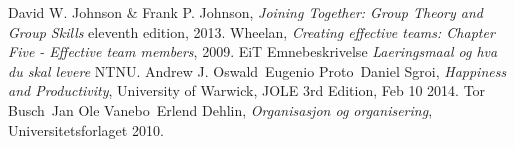 \begin{thebibliography}{99}	%
		David W. Johnson \& Frank P. Johnson,
		\emph{Joining Together: Group Theory and Group Skills}
		eleventh edition,
		2013.
		Wheelan,
		\emph{Creating effective teams: Chapter Five - Effective team members},
		2009.
		EiT Emnebeskrivelse
		\emph{Laeringsmaal og hva du skal levere}
		NTNU.
		Andrew J. Oswald\, Eugenio Proto\, Daniel Sgroi,
		\emph{Happiness and Productivity},
		University of Warwick,
		JOLE 3rd Edition, Feb 10 2014.
		Tor Busch\, Jan Ole Vanebo\, Erlend Dehlin,
		\emph{Organisasjon og organisering},
		Universitetsforlaget 2010.
\end{thebibliography}